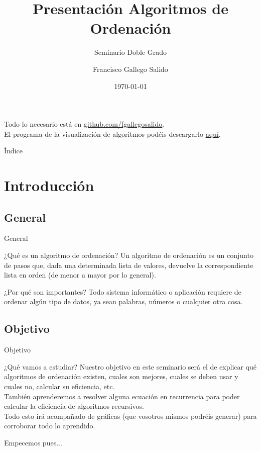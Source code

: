 \documentclass[compress]{beamer}
\title{Presentación Algoritmos de Ordenación}                                               %
\subtitle{Seminario Doble Grado}                                  %
\author{Francisco Gallego Salido}
\institute{Universidad de Granada}
\date{\today}                                                            %
\begin{document}
\begin{frame}
\titlepage
\end{frame}

\begin{frame}
Todo lo necesario está en \href{https://github.com/fgallegosalido}{github.com/fgallegosalido}.\\
\vspace{0.25in}
El programa de la visualización de algoritmos podéis descargarlo \href{https://panthema.net/2013/sound-of-sorting/}{aqu\'i}.
\end{frame}

\begin{frame}{Índice}
  \hypertarget{index}{}
  \tableofcontents
\end{frame}

\section{Introducción}
\subsection{General}

\begin{frame}{General}
	\begin{block}{¿Qué es un algoritmo de ordenación?}
	Un algoritmo de ordenación es un conjunto de pasos que, dada una determinada lista de valores, devuelve la correspondiente lista en orden (de menor a mayor por lo general).
	\end{block}

	\begin{block}{¿Por qué son importantes?}
	Todo sistema informático o aplicación requiere de ordenar algún tipo de datos, ya sean palabras, números o cualquier otra cosa.
	\end{block}
\end{frame}

\subsection{Objetivo}

\begin{frame}{Objetivo}
	\begin{block}{¿Qué vamos a estudiar?}
	Nuestro objetivo en este seminario será el de explicar qué algoritmos de ordenación existen, cuales son mejores, cuales se deben usar y cuales no, calcular su eficiencia, etc.\\
	\vspace{0.20in}
	También aprenderemos a resolver alguna ecuación en recurrencia para poder calcular la eficiencia de algoritmos recursivos.\\
	\vspace{0.20in}
	Todo esto irá acompañado de gráficas (que vosotros mismos podréis generar) para corroborar todo lo aprendido.
	\end{block}
Empecemos pues...
\end{frame}
\end{document}
